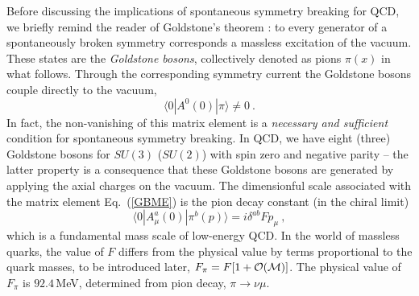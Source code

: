 \documentclass[aps,rmp,nofootinbib,twocolumn,floatfix]{revtex4}
\newcommand{\beq}{\begin{equation}}
\newcommand{\eeq}{\end{equation}}
\begin{document}
Before discussing the implications of spontaneous symmetry breaking for QCD,
we briefly remind the reader of Goldstone's theorem 
\cite{Goldstone:1961eq,Goldstone:1962es}: to every generator of
a spontaneously broken symmetry corresponds a massless excitation of the
vacuum.  These states are the
{\em Goldstone bosons}, collectively denoted as pions $\pi(x)$ in what follows.
Through the corresponding symmetry current the Goldstone bosons couple 
directly to the vacuum,
\beq\label{GBME}
\langle 0 | A^0 (0) | \pi \rangle \neq 0~.
\eeq
In fact, the non-vanishing of this matrix element is a {\it necessary and
sufficient} condition for spontaneous symmetry breaking. In QCD, we have
eight (three) Goldstone bosons for $SU(3)$ ($SU(2)$) with spin zero and 
negative parity -- the latter property is a consequence that these Goldstone 
bosons are generated by applying the axial charges on the vacuum. The
dimensionful scale associated with the matrix element Eq.~(\ref{GBME}) 
is the pion decay constant (in the chiral limit)
\beq\label{GBM}
\langle 0|A^a_\mu(0)|\pi^b(p)\rangle = i \delta^{ab} F p_\mu~,
\eeq
which is a fundamental mass scale of low-energy QCD.
In the world of massless quarks, the value of $F$ differs from the
physical value by terms proportional to the quark masses, to be
introduced later, $F_\pi = F [1 + {\cal O}({\cal M})]$. The physical
value of $F_\pi$ is $92.4\,$MeV, determined from pion decay, $\pi\to \nu\mu$. 
\end{document}
